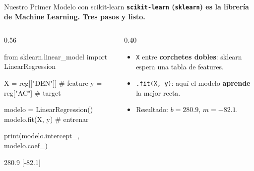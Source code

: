 \documentclass[aspectratio=169, 11pt]{beamer}
\begin{document}
\begin{frame}[fragile,shrink=26]{Nuestro Primer Modelo con scikit-learn}
  \vspace{-4pt}
  {\small\color{arcaDark}\bfseries
    \texttt{scikit-learn} (\texttt{sklearn}) es la librería de Machine Learning. Tres pasos y listo.}

  \vspace{4pt}
  \begin{columns}[T]
    \begin{column}{0.56\textwidth}
      \begin{pyblock}
from sklearn.linear_model import LinearRegression

X = reg[["DEN"]]     # feature
y = reg["AC"]        # target

modelo = LinearRegression()
modelo.fit(X, y)     # entrenar

print(modelo.intercept_, modelo.coef_)
      \end{pyblock}
      \vspace{2pt}
      \begin{outputblock}
280.9   [-82.1]
      \end{outputblock}
    \end{column}
    \begin{column}{0.40\textwidth}
      {\scriptsize\color{textMuted}
      \begin{itemize}\setlength{\itemsep}{4pt}
        \item[{\color{arcaRed}\scriptsize\faArrowRight}]
          \texttt{X} entre \textbf{corchetes dobles}: sklearn
          espera una tabla de features.
        \item[{\color{arcaRed}\scriptsize\faArrowRight}]
          \texttt{.fit(X, y)}: aquí el modelo \textbf{aprende}
          la mejor recta.
        \item[{\color{codeGreen}\scriptsize\faCheck}]
          Resultado: \(b=280.9\), \(m=-82.1\).
      \end{itemize}
      }
    \end{column}
  \end{columns}
\end{frame}
\end{document}
